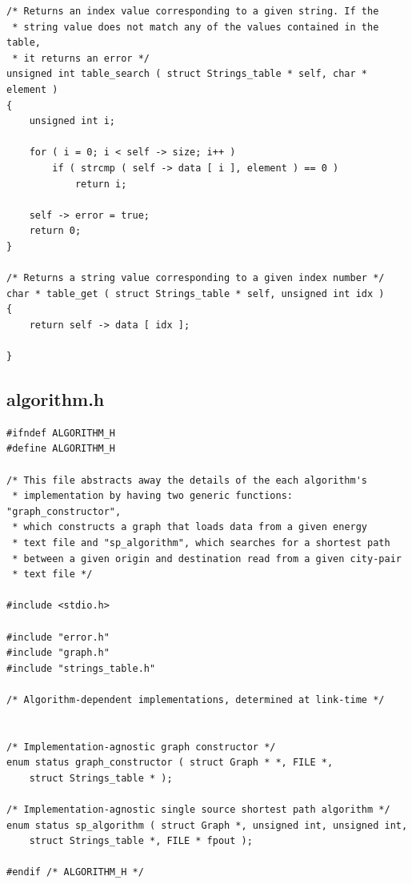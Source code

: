 \documentclass[11pt]{article}
\begin{document}
\begin{verbatim}
/* Returns an index value corresponding to a given string. If the
 * string value does not match any of the values contained in the table,
 * it returns an error */
unsigned int table_search ( struct Strings_table * self, char * element )
{
    unsigned int i;

    for ( i = 0; i < self -> size; i++ )
        if ( strcmp ( self -> data [ i ], element ) == 0 )
            return i;

    self -> error = true;
    return 0;
}

/* Returns a string value corresponding to a given index number */
char * table_get ( struct Strings_table * self, unsigned int idx )
{
    return self -> data [ idx ];

}
\end{verbatim}
\newpage
\subsection{algorithm.h}
\begin{verbatim}
#ifndef ALGORITHM_H
#define ALGORITHM_H

/* This file abstracts away the details of the each algorithm's
 * implementation by having two generic functions: "graph_constructor",
 * which constructs a graph that loads data from a given energy
 * text file and "sp_algorithm", which searches for a shortest path
 * between a given origin and destination read from a given city-pair
 * text file */

#include <stdio.h>

#include "error.h"
#include "graph.h"
#include "strings_table.h"

/* Algorithm-dependent implementations, determined at link-time */


/* Implementation-agnostic graph constructor */
enum status graph_constructor ( struct Graph * *, FILE *,
    struct Strings_table * );

/* Implementation-agnostic single source shortest path algorithm */
enum status sp_algorithm ( struct Graph *, unsigned int, unsigned int,
    struct Strings_table *, FILE * fpout );

#endif /* ALGORITHM_H */
\end{verbatim}
\newpage
\end{document}
